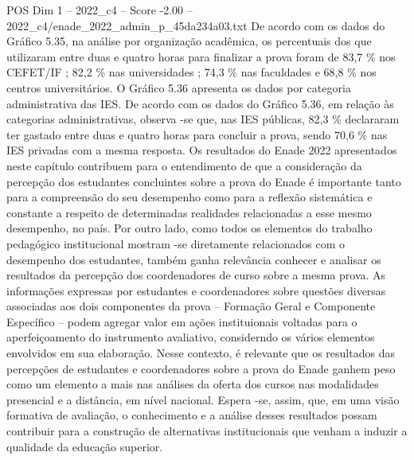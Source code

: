 \begin{textsample}{POS Dim 1 – 2022\_c4 – Score -2.00 – 2022\_c4/enade\_2022\_admin\_p\_45da234a03.txt}
De acordo com os dados do Gráfico 5.35, na análise por organização acadêmica, os percentuais dos que utilizaram entre duas e quatro horas para finalizar a prova foram de 83,7 \% nos CEFET/IF ; 82,2 \% nas universidades ; 74,3 \% nas faculdades e 68,8 \% nos centros universitários.
O Gráfico 5.36 apresenta os dados por categoria administrativa das IES.
De acordo com os dados do Gráfico 5.36, em relação às categorias administrativas, observa -se que, nas IES públicas, 82,3 \% declararam ter gastado entre duas e quatro horas para concluir a prova, sendo 70,6 \% nas IES privadas com a mesma resposta.
Os resultados do Enade 2022 apresentados neste capítulo contribuem para o entendimento de que a consideração da percepção dos estudantes concluintes sobre a prova do Enade é importante tanto para a compreensão do seu desempenho como para a reflexão sistemática e constante a respeito de determinadas realidades relacionadas a esse mesmo desempenho, no país.
Por outro lado, como todos os elementos do trabalho pedagógico institucional mostram -se diretamente relacionados com o desempenho dos estudantes, também ganha relevância conhecer e analisar os resultados da percepção dos coordenadores de curso sobre a mesma prova.
As informações expressas por estudantes e coordenadores sobre questões diversas associadas aos dois componentes da prova – Formação Geral e Componente Específico – podem agregar valor em ações instituionais voltadas para o aperfeiçoamento do instrumento avaliativo, considerndo os vários elementos envolvidos em sua elaboração.
Nesse contexto, é relevante que os resultados das percepções de estudantes e coordenadores sobre a prova do Enade ganhem peso como um elemento a mais nas análises da oferta dos cursos nas modalidades presencial e a distância, em nível nacional.
Espera -se, assim, que, em uma visão formativa de avaliação, o conhecimento e a análise desses resultados possam contribuir para a construção de alternativas institucionais que venham a induzir a qualidade da educação superior.

\end{textsample}
